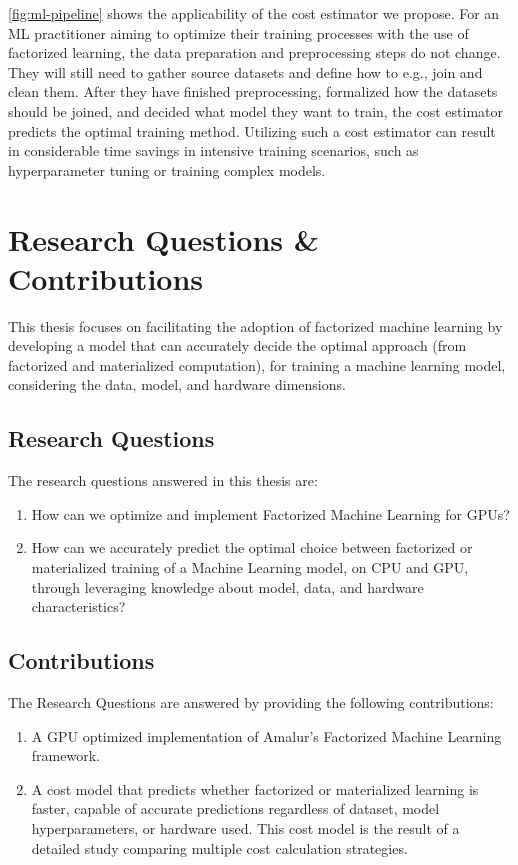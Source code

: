 \autoref{fig:ml-pipeline} shows the applicability of the cost estimator we propose. For an ML practitioner aiming to optimize their training processes with the use of factorized learning, the data preparation and preprocessing steps do not change. They will still need to gather source datasets and define how to e.g., join and clean them. After they have finished preprocessing, formalized how the datasets should be joined, and decided what model they want to train, the cost estimator predicts the optimal training method. Utilizing such a cost estimator can result in considerable time savings in intensive training scenarios, such as hyperparameter tuning or training complex models.


\section{Research Questions \& Contributions}
This thesis focuses on facilitating the adoption of factorized machine learning by developing a model that can accurately decide the optimal approach (from factorized and materialized computation), for training a machine learning model, considering the data, model, and hardware dimensions.

\subsection{Research Questions}
The research questions answered in this thesis are:
\begin{enumerate}[leftmargin=1.5cm, label=\emph{RQ.\arabic*}]
    \item How can we optimize and implement Factorized Machine Learning for GPUs?
    \item How can we accurately predict the optimal choice between factorized or materialized training of a Machine Learning model, on CPU and GPU, through leveraging knowledge about model, data, and hardware characteristics?
\end{enumerate}

\subsection{Contributions}
The Research Questions are answered by providing the following contributions:
\begin{enumerate}[leftmargin=1.5cm, label=\emph{C.\arabic*}]
    \item A GPU optimized implementation of Amalur's Factorized Machine Learning framework.
    \item A cost model that predicts whether factorized or materialized learning is faster, capable of accurate predictions regardless of dataset, model hyperparameters, or hardware used. This cost model is the result of a detailed study comparing multiple cost calculation strategies.
\end{enumerate}

